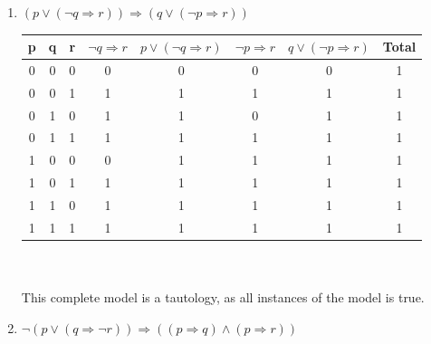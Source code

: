 \begin{large}
\begin{enumerate}[label= (\alph*)]
    \item $ (p \lor(\neg q \Rightarrow r)) \Rightarrow (q \lor (\neg p \Rightarrow r)) $

          \begin{tabular}{c|c|c|c|c|c|c||c}
            p & q & r & $ \neg q \Rightarrow r $ & $ p \lor (\neg q \Rightarrow r) $ & $ \neg p \Rightarrow r $ & $ q \lor (\neg p \Rightarrow r) $ & Total \\
            \hline\hline
            0 & 0 & 0 & 0                        & 0                                 & 0                        & 0                                 & 1     \\
            \hline
            0 & 0 & 1 & 1                        & 1                                 & 1                        & 1                                 & 1     \\
            \hline
            0 & 1 & 0 & 1                        & 1                                 & 0                        & 1                                 & 1     \\
            \hline
            0 & 1 & 1 & 1                        & 1                                 & 1                        & 1                                 & 1     \\
            \hline
            1 & 0 & 0 & 0                        & 1                                 & 1                        & 1                                 & 1     \\
            \hline
            1 & 0 & 1 & 1                        & 1                                 & 1                        & 1                                 & 1     \\
            \hline
            1 & 1 & 0 & 1                        & 1                                 & 1                        & 1                                 & 1     \\
            \hline
            1 & 1 & 1 & 1                        & 1                                 & 1                        & 1                                 & 1     \\
            \hline
          \end{tabular}
          \\ \\
          This complete model is a tautology, as all instances of the model is true.

    \item $ \neg(p \lor( q \Rightarrow \neg r)) \Rightarrow (( p \Rightarrow  q) \land ( p \Rightarrow  r)) $


\end{enumerate}
\end{large}
